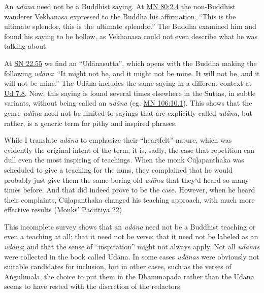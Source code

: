 \documentclass[12pt,openany]{book}%
\begin{document}
An \textit{\textsanskrit{udāna}} need not be a Buddhist saying. At \href{https://suttacentral.net/mn80/en/sujato\#2.4}{MN 80:2.4} the non-Buddhist wanderer Vekhanasa expressed to the Buddha his affirmation, “This is the ultimate splendor, this is the ultimate splendor.” The Buddha examined him and found his saying to be hollow, as Vekhanasa could not even describe what he was talking about.

At \href{https://suttacentral.net/sn22.55/en/sujato}{SN 22.55}  we find an “\textsanskrit{Udānasutta}”, which opens with the Buddha making the following \textit{\textsanskrit{udāna}}: “It might not be, and it might not be mine. It will not be, and it will not be mine.” The \textsanskrit{Udāna} includes the same saying in a different context at \href{https://suttacentral.net/ud7.8/en/sujato}{Ud 7.8}. Now, this saying is found several times elsewhere in the Suttas, in subtle variants, without being called an \textit{\textsanskrit{udāna}} (eg. \href{https://suttacentral.net/mn106/en/sujato\#10.1}{MN 106:10.1}). This shows that the genre \textit{\textsanskrit{udāna}} need not be limited to sayings that are explicitly called \textit{\textsanskrit{udāna}}, but rather, is a generic term for pithy and inspired phrases. 

While I translate \textit{\textsanskrit{udāna}} to emphasize their “heartfelt” nature, which was evidently the original intent of the term, it is, sadly, the case that repetition can dull even the most inspiring of teachings. When the monk \textsanskrit{Cūḷapanthaka} was scheduled to give a teaching for the nuns, they complained that he would probably just give them the same boring old \textit{\textsanskrit{udāna}} that they‘d heard so many times before. And that did indeed prove to be the case. However, when he heard their complaints, \textsanskrit{Cūḷapanthaka} changed his teaching approach, with much more effective results (\href{https://suttacentral.net/pli-tv-bu-vb-pc22/en/brahmali}{Monks’ Pācittiya 22}). 

This incomplete survey shows that an \textit{\textsanskrit{udāna}} need not be a Buddhist teaching or even a teaching at all; that it need not be verse; that it need not be labeled as an \textit{\textsanskrit{udāna}}; and that the sense of “inspiration” might not always apply. Not all \textit{\textsanskrit{udānas}} were collected in the book called \textsanskrit{Udāna}. In some cases \textit{\textsanskrit{udānas}} were obviously not suitable candidates for inclusion, but in other cases, such as the verses of \textsanskrit{Aṅgulimāla}, the choice to put them in the Dhammapada rather than the \textsanskrit{Udāna} seems to have rested with the discretion of the redactors. 
\end{document}

